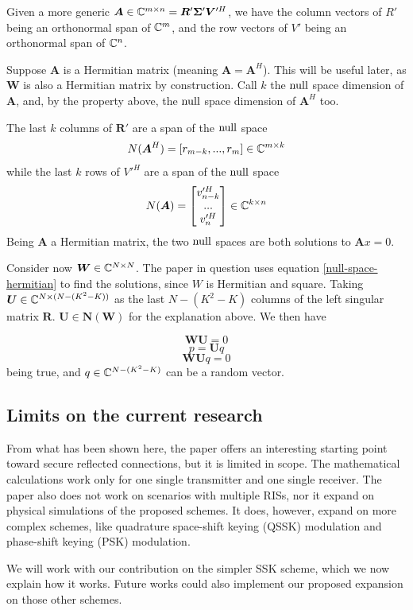 Given a more generic $\bm{A} \in \mathbb{C}^{m \times n} = \bm{R}'\bm{ \Sigma}' \bm{V}'^H$, we have the column vectors of $R'$ being an orthonormal span of $\mathbb{C}^m$, and the row vectors of $V'$ being an orthonormal span of $\mathbb{C}^n$.

Suppose $\bm{A}$ is a Hermitian matrix (meaning $\bm{A} = \bm{A}^H$). This will be useful later, as $\bm{W}$ is also a Hermitian matrix by construction. Call $k$ the $\operatorname{null}$ space dimension of $\bm{A}$, and, by the property above, the $\operatorname{null}$ space dimension of $\bm{A}^H$ too.

The last $k$ columns of $\bm{R}'$ are a span of the $\operatorname{null}$ space
\begin{equation}
  N(\bm{A}^H) = [r_{m-k}, ..., r_m ] \in \mathbb{C}^{m \times k}
  \label{null-space-hermitian}
\end{equation}
while the last $k$ rows of $V'^H$ are a span of the $\operatorname{null}$ space
\begin{equation}
  N(\bm{A}) = \begin{bmatrix} v'^H_{n-k} \\ ... \\ v'^H_n \end{bmatrix} \in \mathbb{C}^{k \times n}
  \label{null-space-normal}
\end{equation}
Being $\bm{A}$ a Hermitian matrix, the two $\operatorname{null}$ spaces are both solutions to $\bm{A}x = 0$.

Consider now $\bm{W} \in \mathbb{C}^{N \times N}$. The paper in question uses equation \eqref{null-space-hermitian} to find the solutions, since $W$ is Hermitian and square. Taking $\bm{U} \in \mathbb{C} ^ {N \times (N-(K^2 - K))}$ as the last $N-(K^2 - K)$ columns of the left singular matrix $\bm{R}$. $\bm{U} \in \bm{N}(\bm{W})$ for the explanation above. We then have

\begin{equation}\bm{WU} = 0\end{equation}
\begin{equation}p = \bm{U}q\end{equation}
\begin{equation}
  \bm{WU}q = 0
  \label{q_random_vector}
\end{equation}
being true, and $q \in \mathbb{C}^{N-(K^2 - K)}$ can be a random vector.

\subsection{Limits on the current research}

From what has been shown here, the paper \cite{9328149} offers an interesting starting point toward secure reflected connections, but it is limited in scope. The mathematical calculations work only for one single transmitter and one single receiver. The paper also does not work on scenarios with multiple RISs, nor it expand on physical simulations of the proposed schemes. It does, however, expand on more complex schemes, like quadrature space-shift keying (QSSK) modulation and phase-shift keying (PSK) modulation.

We will work with our contribution on the simpler SSK scheme, which we now explain how it works. Future works could also implement our proposed expansion on those other schemes.
